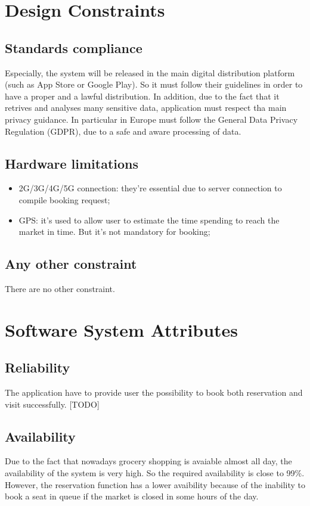 \section{Design Constraints}
\subsection{Standards compliance}
Especially, the system will be released in the main digital distribution platform (such as App Store or Google Play). So it must follow their guidelines in order to have a proper and a lawful distribution. In addition, due to the fact that it retrives and analyses many sensitive data, application must respect tha main privacy guidance. In particular in Europe must follow the General Data Privacy Regulation (GDPR), due to a safe and aware processing of data. 
\subsection{Hardware limitations}
\begin{itemize}
\item 2G/3G/4G/5G connection: they're essential due to server connection to compile booking request;
\item GPS: it's used to allow user to estimate the time spending to reach the market in time. But it's not mandatory for booking;
\end{itemize}
\subsection{Any other constraint}
There are no other constraint.
\section{Software System Attributes}
\subsection{Reliability}
The application have to provide user the possibility to book both reservation and visit successfully. [TODO] 
\subsection{Availability}
Due to the fact that nowadays grocery shopping is avaiable almost all day, the availability of the system is very high. So the required availability is close to 99\%. However, the reservation function has a lower avaibility because of the inability to book a seat in queue if the market is closed in some hours of the day. 
